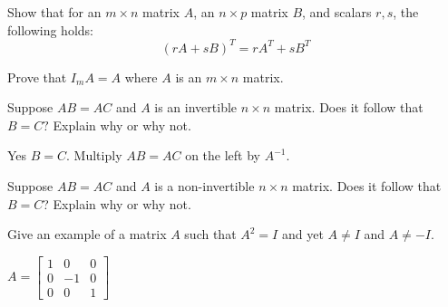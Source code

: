 \documentclass{ximera}
\begin{document}
\begin{problem}\label{prb:4.30} Show that for an $m \times n$ matrix $A$, an $n \times p$ matrix $B$, and scalars $r, s$, the following holds:
\[
\left( rA + sB \right) ^T = rA^{T} + sB^{T}
\]
\end{problem}

\begin{problem}\label{prb:4.31} Prove that $I_{m}A=A$ where $A$ is an $m\times n$ matrix.
\end{problem}

\begin{problem}\label{prb:4.32} Suppose $AB=AC$ and $A$ is an invertible $n\times n$ matrix. Does it
follow that $B=C?$ Explain why or why not.
\begin{hint}
Yes $B=C$. Multiply $AB = AC$ on the left by $A^{-1}$.
\end{hint}
\end{problem}

\begin{problem}\label{prb:4.33} Suppose $AB=AC$ and $A$ is a non-invertible $n\times n$ matrix. Does it follow that $B=C$? Explain why or why not.
\end{problem}

\begin{problem}\label{prb:4.34} Give an example of a matrix $A$ such that $A^{2}=I$ and yet $A\neq I$
and $A\neq -I.$
\begin{hint}
$A = \left[
\begin{array}{rrr}
1 & 0 & 0 \\
0 & -1 & 0 \\
0 & 0 & 1
\end{array}
\right] $
\end{hint}
\end{problem}
\end{document}
